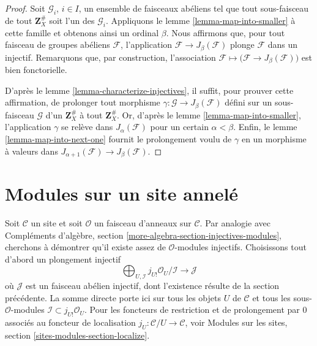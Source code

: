 \begin{proof}
Soit $\mathcal{G}_i$, $i \in I$, un ensemble de faisceaux abéliens tel que
tout sous-faisceau de tout $\mathbf{Z}_X^\#$ soit l'un des $\mathcal{G}_i$.
Appliquons le lemme \ref{lemma-map-into-smaller} à cette famille et obtenons
ainsi un ordinal $\beta$. Nous affirmons que, pour tout faisceau de groupes
abéliens $\mathcal{F}$, l'application
$\mathcal{F} \to J_\beta(\mathcal{F})$ plonge $\mathcal{F}$ dans un injectif.
Remarquons que, par construction, l'association
$\mathcal{F} \mapsto \big(\mathcal{F} \to J_\beta(\mathcal{F})\big)$ est bien
fonctorielle.

\medskip\noindent
D'après le lemme \ref{lemma-characterize-injectives}, il suffit, pour prouver
cette affirmation, de prolonger tout morphisme
$\gamma : \mathcal{G} \to J_\beta(\mathcal{F})$ défini sur un sous-faisceau
$\mathcal{G}$ d'un $\mathbf{Z}_X^\#$ à tout $\mathbf{Z}_X^\#$. Or, d'après le
lemme \ref{lemma-map-into-smaller}, l'application $\gamma$ se relève dans
$J_\alpha(\mathcal{F})$ pour un certain $\alpha < \beta$. Enfin, le
lemme \ref{lemma-map-into-next-one} fournit le prolongement voulu de $\gamma$
en un morphisme à valeurs dans
$J_{\alpha + 1}(\mathcal{F}) \to J_\beta(\mathcal{F})$.
\end{proof}






\section{Modules sur un site annelé}
\label{section-sheaves-modules}

\noindent
Soit $\mathcal{C}$ un site et soit $\mathcal{O}$ un faisceau d'anneaux sur
$\mathcal{C}$. Par analogie avec
Compléments d'algèbre, section \ref{more-algebra-section-injectives-modules},
cherchons à démontrer qu'il existe assez de $\mathcal{O}$-modules injectifs.
Choisissons tout d'abord un plongement injectif
$$
\bigoplus\nolimits_{U, \mathcal{I}}
j_{U!}\mathcal{O}_U/\mathcal{I}
\longrightarrow
\mathcal{J}
$$
où $\mathcal{J}$ est un faisceau abélien injectif, dont l'existence résulte de
la section précédente. La somme directe porte ici sur tous les objets $U$ de
$\mathcal{C}$ et tous les sous-$\mathcal{O}$-modules
$\mathcal{I} \subset j_{U!}\mathcal{O}_U$. Pour les foncteurs de restriction
et de prolongement par $0$ associés au foncteur de localisation
$j_U : \mathcal{C}/U \to \mathcal{C}$, voir
Modules sur les sites, section \ref{sites-modules-section-localize}.

